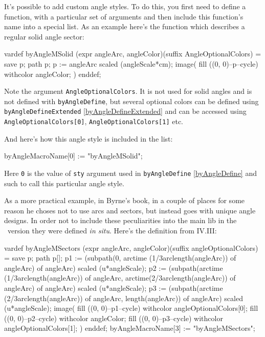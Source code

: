 \documentclass{ltxdoc}
\begin{document}
	It's possible to add custom angle styles. To do this, you first need to define a function, with a particular set of arguments and then include this function's name into a special list. As an example here's the function which describes a regular solid angle sector:
	
\begin{MetaPostCode}
vardef byAngleMSolid (expr angleArc, angleColor)(suffix AngleOptionalColors) =
    save p;
    path p;
    p := angleArc scaled (angleScale*cm);
    image(
        fill ((0, 0)--p--cycle) withcolor angleColor;
    )
enddef;
\end{MetaPostCode}

	Note the argument \texttt{AngleOptionalColors}. It is not used for solid angles and is not defined with \texttt{byAngleDefine}, but several optional colors can be defined using \texttt{byAngleDefineExtended} \ref{byAngleDefineExtended} and can be accessed using \texttt{AngleOptionalColors[0]}, \texttt{AngleOptionalColors[1]} etc.

	And here's how this angle style is included in the list:

\begin{MetaPostCode}
byAngleMacroName[0] := "byAngleMSolid";
\end{MetaPostCode}

	Here \texttt{0} is the value of \texttt{sty} argument used in \texttt{byAngleDefine} \ref{byAngleDefine} and such to call this particular angle style.
	
	As a more practical example, in Byrne's book, in a couple of places for some reason he choses not to use arcs and sectors, but instead goes with unique angle designs. In order not to include these peculiarities into the main lib in the \ConTeXt\ version they were defined \textit{in situ}. Here's the definition from IV.III:

\begin{MetaPostCode}	
vardef byAngleMSectors (expr angleArc, angleColor)(suffix angleOptionalColors) =
    save p;
    path p[];
    p1 := (subpath(0, arctime (1/3arclength(angleArc)) of angleArc) 
    	of angleArc) 
    	scaled (u*angleScale);
    p2 := (subpath(arctime (1/3arclength(angleArc)) 
    	of angleArc, arctime(2/3arclength(angleArc)) of angleArc) of angleArc) 
    	scaled (u*angleScale);
    p3 := (subpath(arctime (2/3arclength(angleArc)) 
    	of angleArc, length(angleArc)) of angleArc) 
    	scaled (u*angleScale);
    image(
        fill ((0, 0)--p1--cycle) withcolor angleOptionalColors[0];
        fill ((0, 0)--p2--cycle) withcolor angleColor;
        fill ((0, 0)--p3--cycle) withcolor angleOptionalColors[1];
    )
enddef;
byAngleMacroName[3] := "byAngleMSectors";
\end{MetaPostCode}
\end{document}
